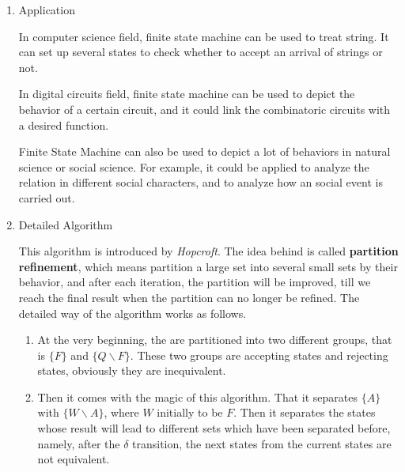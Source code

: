 \documentclass{article}
\begin{document}
\begin{enumerate}
\item Application

In computer science field, finite state machine can be used to treat string. It can set up several states to check whether to accept an arrival of strings or not.


In digital circuits field, finite state machine can be used to depict the behavior of a certain circuit, and it could link the combinatoric circuits with a desired function.


Finite State Machine can also be used to depict a lot of behaviors in natural science or social science. For example, it could be applied to analyze the relation in different social characters, and to analyze how an social event is carried out.


\item Detailed Algorithm

This algorithm is introduced by \textit{Hopcroft}. The idea behind is called \textbf{partition refinement}, which means partition a large set into several small sets by their behavior, and after each iteration, the partition will be improved, till we reach the final result when the partition can no longer be refined. The detailed way of the algorithm works as follows.
\begin{enumerate}
\item 
At the very beginning, the are partitioned into two different groups, that is $\{F\}$ and $\{Q\backslash F\}$. These two groups are accepting states and rejecting states, obviously they are inequivalent.

\item 
Then it comes with the magic of this algorithm. That it separates $\{A\}$ with $\{W\backslash A\}$, where $W$ initially to be $F$. Then it separates the states whose result will lead to different sets which have been separated before, namely, after the $\delta$ transition, the next states from the current states are not equivalent. 


\end{enumerate}
\end{enumerate}
\end{document}
